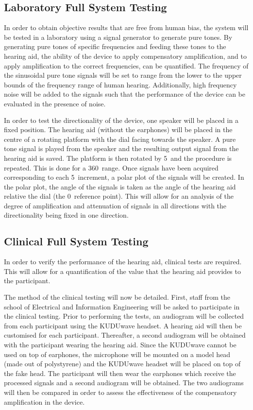 \documentclass[10pt,twocolumn]{witseiepaper}
\begin{document}
\subsection{Laboratory Full System Testing} \label{sec:laboratory}
In order to obtain objective results that are free from human bias, the system will be tested in a laboratory using a signal generator to generate pure tones. By generating pure tones of specific frequencies and feeding these tones to the hearing aid, the ability of the device to apply compensatory amplification, and to apply amplification to the correct frequencies, can be quantified. The frequency of the sinusoidal pure tone signals will be set to range from the lower to the upper bounds of the frequency range of human hearing. Additionally, high frequency noise will be added to the signals such that the performance of the device can be evaluated in the presence of noise.

In order to test the directionality of the device, one speaker will be placed in a fixed position. The hearing aid (without the earphones) will be placed in the centre of a rotating platform with the dial facing towards the speaker. A pure tone signal is played from the speaker and the resulting output signal from the hearing aid is saved. The platform is then rotated by 5\textdegree\ and the procedure is repeated. This is done for a 360\textdegree\ range. Once signals have been acquired corresponding to each 5\textdegree\ increment, a polar plot of the signals will be created. In the polar plot, the angle of the signals is taken as the angle of the hearing aid relative the dial (the 0\textdegree\ reference point). This will allow for an analysis of the degree of amplification and attenuation of signals in all directions with the directionality being fixed in one direction.

\subsection{Clinical Full System Testing} \label{sec:clinical}
In order to verify the performance of the hearing aid, clinical tests are required. This will allow for a quantification of the value that the hearing aid provides to the participant.

The method of the clinical testing will now be detailed. First, staff from the school of Electrical and Information Engineering will be asked to participate in the clinical testing. Prior to performing the tests, an audiogram will be collected from each participant using the KUDUwave headset. A hearing aid will then be customised for each participant. Thereafter, a second audiogram will be obtained with the participant wearing the hearing aid. Since the KUDUwave cannot be used on top of earphones, the microphone will be mounted on a model head (made out of polystyrene) and the KUDUwave headset will be placed on top of the fake head. The participant will then wear the earphones which receive the processed signals and a second audiogram will be obtained. The two audiograms will then be compared in order to assess the effectiveness of the compensatory amplification in the device.
\end{document}
